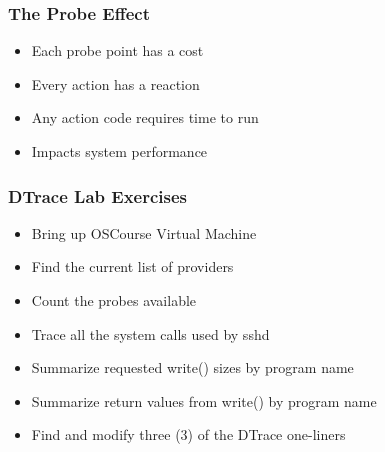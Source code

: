 \documentclass[pdftex]{beamer} %
\begin{document}
\begin{frame}
  \frametitle{The Probe Effect}
  \begin{itemize}
  \item Each probe point has a cost
  \item Every action has a reaction
  \item Any action code requires time to run
  \item Impacts system performance
  \end{itemize}
\end{frame}

\begin{frame}
  \frametitle{DTrace Lab Exercises}
  \begin{itemize}
  \item Bring up OSCourse Virtual Machine
  \item Find the current list of providers
  \item Count the probes available
  \item Trace all the system calls used by sshd
  \item Summarize requested write() sizes by program name
  \item Summarize return values from write() by program name
  \item Find and modify three (3) of the DTrace one-liners
  \end{itemize}
\end{frame}
\end{document}
